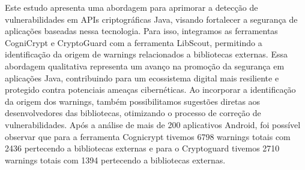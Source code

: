 Este estudo apresenta uma abordagem para aprimorar a detecção de vulnerabilidades em APIs
criptográficas Java, visando fortalecer a segurança de aplicações baseadas nessa tecnologia. 
Para isso, integramos as ferramentas CogniCrypt e CryptoGuard com a ferramenta LibScout, permitindo a 
identificação da origem de warnings relacionados a bibliotecas externas. 
Essa abordagem qualitativa representa um avanço na promoção da segurança em aplicações Java,
contribuindo para um ecossistema digital mais resiliente e protegido contra potenciais 
ameaças cibernéticas. Ao incorporar a identificação da origem dos warnings, também possibilitamos 
sugestões diretas aos desenvolvedores das bibliotecas, otimizando o processo de correção de 
vulnerabilidades. Após a análise de mais de 200 aplicativos Android, foi possível observar que para
a ferramenta Cognicrypt tivemos 6798 warnings totais com 2436 pertecendo a bibliotecas externas e para o
Cryptoguard tivemos 2710 warnings totais com 1394 pertecendo a bibliotecas externas.